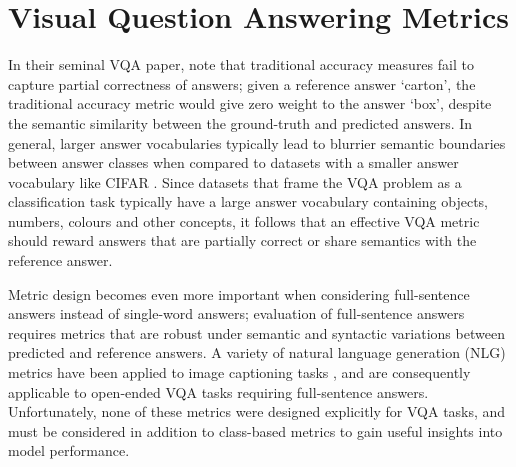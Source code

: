 

\section{Visual Question Answering Metrics}

In their seminal VQA paper, \citeauthor{malinowski2014multiworld} \cite{malinowski2014multiworld} note that traditional accuracy measures fail to capture partial correctness of answers; given a reference answer `carton', the traditional accuracy metric would give zero weight to the answer `box', despite the semantic similarity between the ground-truth and predicted answers. In general, larger answer vocabularies typically lead to blurrier semantic boundaries between answer classes when compared to datasets with a smaller answer vocabulary like CIFAR \cite{krizhevsky2009learning}. Since datasets that frame the VQA problem as a classification task typically have a large answer vocabulary containing objects, numbers, colours and other concepts, it follows that an effective VQA metric should reward answers that are partially correct or share semantics with the reference answer.

Metric design becomes even more important when considering full-sentence answers instead of single-word answers; evaluation of full-sentence answers requires metrics that are robust under semantic and syntactic variations between predicted and reference answers. A variety of natural language generation (NLG) metrics \cite{papineni2002bleu, lin2004rouge, banerjee2005meteor, vedantam2015cider} have been applied to image captioning tasks \cite{chen2015microsoft, vedantam2015cider}, and are consequently applicable to open-ended VQA tasks requiring full-sentence answers. Unfortunately, none of these metrics were designed explicitly for VQA tasks, and must be considered in addition to class-based metrics to gain useful insights into model performance. 

